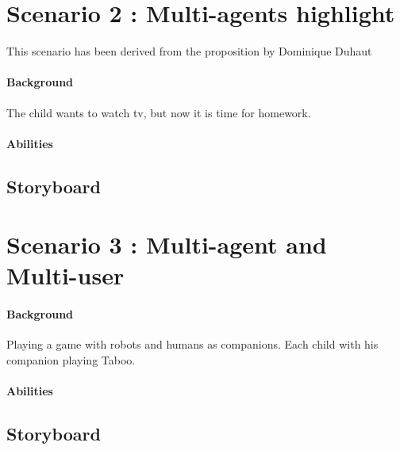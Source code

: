 

\section{Scenario 2 : Multi-agents highlight}
This scenario has been derived from the proposition by Dominique Duhaut 
\paragraph{Background}
The child wants to watch tv, but now it is time for homework.
\paragraph{Abilities}

\subsection{Storyboard}

\section{Scenario 3 : Multi-agent and Multi-user}
\paragraph{Background}
Playing a game with robots and humans as companions. 
Each child with his companion playing Taboo. 
 \paragraph{Abilities}


\subsection{Storyboard}



